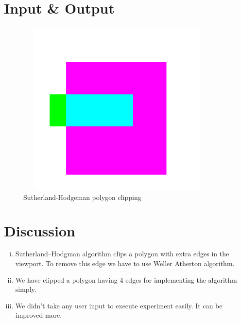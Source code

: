 \documentclass[11pt]{report}
\begin{document}
\section{Input \& Output}
\begin{figure}[ht!]
	\centering
	\includegraphics[height=3.5in,width=4in]{polygon_clip}
	\caption{Sutherland-Hodgeman polygon clipping}
\end{figure}

\section{Discussion}
\begin{enumerate}[(i)]
	\item Sutherland–Hodgman algorithm clips a polygon with extra edges in the viewport. To remove this edge we have to use Weller Atherton algorithm. 
	\item We have clipped a polygon having 4 edges for implementing the algorithm simply.
	\item We didn't take any user input to execute experiment easily. It can be improved more. 
\end{enumerate}

	
\end{document}
